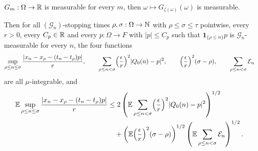 \begin{lemma}
\begin{enumerate}
$G_m:\Omega\to\mathbb{R}$ is measurable for every $m$, then
$\omega\mapsto G_{\zeta(\omega)}(\omega)$ is measurable.
\end{enumerate}
Then for all $(\mathcal G_n)$-stopping times $\rho,\sigma:\Omega\to\mathbb{N}$ with
$\rho\le\sigma\le\tau$ pointwise, every $r>0$, every $C_p\in\mathbb{R}$ and every
$p:\Omega\to F$ with $|p|\le C_p$ such that
$\mathbf1_{\{\rho\le n\}}p$ is $\mathcal G_n$-measurable for every $n$, the four
functions
\[
  \sup_{\rho\le n\le\sigma}\frac{|x_n-x_\rho-(t_n-t_\rho)p|}{r},\qquad
  \sum_{\rho\le n<\sigma}\Bigl(\frac{\epsilon}{r}\Bigr)^2|Q_0(n)-p|^2,\qquad
  \Bigl(\frac{\epsilon}{r}\Bigr)^2(\sigma-\rho),\qquad
  \sum_{\rho\le n<\sigma}\mathcal E_n
\]
are all $\mu$-integrable, and
\begin{equation}\label{eq:sptb-travel}
\begin{split}
  \mathbb E\sup_{\rho\le n\le\sigma}
     \frac{|x_n-x_\rho-(t_n-t_\rho)p|}{r}
  &\le 2\left(\mathbb E\sum_{\rho\le n<\sigma}
        \Bigl(\frac{\epsilon}{r}\Bigr)^2|Q_0(n)-p|^2\right)^{1/2}\\
  &\quad+\left(\mathbb E\Bigl(\frac{\epsilon}{r}\Bigr)^2(\sigma-\rho)\right)^{1/2}
     \left(\mathbb E\sum_{\rho\le n<\sigma}\mathcal E_n\right)^{1/2}.
\end{split}
\end{equation}
\end{lemma}
